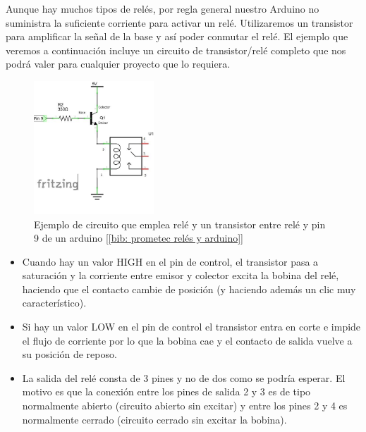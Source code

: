 \documentclass[12pt]{article}
\begin{document}
	\noindent Aunque hay muchos tipos de relés, por regla general nuestro Arduino no suministra la suficiente corriente para activar un relé. Utilizaremos un transistor para amplificar la señal de la base y así poder conmutar el relé. El ejemplo que veremos a continuación incluye un circuito de transistor/relé completo que nos podrá valer para  cualquier proyecto que lo requiera.
	
	\begin{figure}[h]
		\begin{center}
			\includegraphics[width=0.4\textwidth]{img/rele_transistor.jpg}
			\caption{Ejemplo de circuito que emplea relé y un transistor entre relé y pin 9 de un arduino [\ref{bib: prometec relés y arduino}]}
			\label{Ejemplo rele con transistor}
		\end{center}
	\end{figure}
	
	\begin{itemize}
		\item Cuando hay un valor HIGH en el pin de control,  el transistor pasa a saturación  y la corriente entre emisor y colector excita la bobina del relé, haciendo que el contacto cambie de posición (y haciendo además un clic muy característico).
		
		\item Si hay un valor LOW en el pin de control el transistor entra en corte e impide el flujo de corriente por lo que la bobina cae y el contacto de salida vuelve a su posición de reposo.
		
		\item La salida del relé consta de 3 pines y no de dos como se podría esperar.  El motivo es que la conexión entre los pines de salida 2 y 3 es de tipo normalmente abierto (circuito abierto sin excitar) y entre los pines 2 y 4 es normalmente cerrado (circuito cerrado sin excitar la bobina).

	\end{itemize}
	
\end{document}
